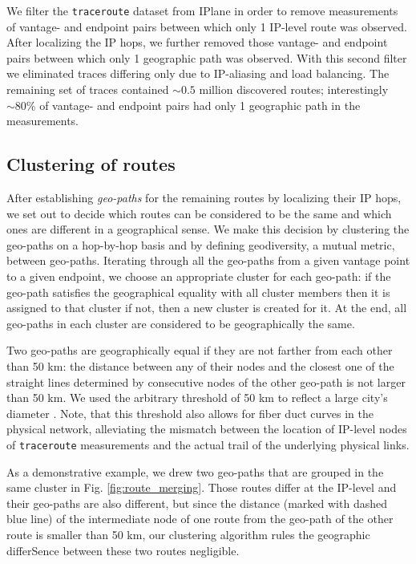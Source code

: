 \documentclass[peerreview]{IEEEtran}
\begin{document}
We filter the \texttt{traceroute} dataset from IPlane in order to remove
measurements of vantage- and endpoint pairs between which only 1 IP-level route
was observed. After localizing the IP hops, we further removed those vantage-
and endpoint pairs between which only 1 geographic path was observed. With this
second filter we eliminated traces differing only due to IP-aliasing and load
balancing. The remaining set of traces contained $\sim0.5$ million discovered
routes; interestingly $\sim80$\% of vantage- and endpoint pairs had only 1
geographic path in the measurements.

\subsection{Clustering of routes}
\label{sec:geodiverse-routes}

After establishing \textit{geo-paths} for the remaining routes by localizing
their IP hops, we set out to decide which routes can be considered to be the
same and which ones are different in a geographical sense. We make this decision
by clustering the geo-paths on a hop-by-hop basis and by defining geodiversity,
a mutual metric, between geo-paths. Iterating through all the geo-paths from a
given vantage point to a given endpoint, we choose an appropriate cluster for
each geo-path: if the geo-path satisfies the geographical equality with all
cluster members then it is assigned to that cluster if not, then a new cluster
is created for it. At the end, all geo-paths in each cluster are considered to
be geographically the same.

Two geo-paths are geographically equal if they are not farther from each other
than 50 km: the distance between any of their nodes and the closest one of the
straight lines determined by consecutive nodes of the other geo-path is not
larger than 50 km. We used the arbitrary threshold of 50 km to reflect a large
city's diameter \cite{geoloc_db}. Note, that this threshold also allows for
fiber duct curves in the physical network, alleviating the mismatch between the
location of IP-level nodes of \texttt{traceroute} measurements and the actual
trail of the underlying physical links.

As a demonstrative example, we drew two geo-paths that are grouped in the same
cluster in Fig. \ref{fig:route_merging}. Those routes differ at the IP-level and
their geo-paths are also different, but since the distance (marked with dashed
blue line) of the intermediate node of one route from the geo-path of the other
route is smaller than 50 km, our clustering algorithm rules the geographic
differSence between these two routes negligible.
\end{document}
